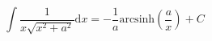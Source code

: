 $$
  \int \frac{1}{x \sqrt{x^2 + a^2}} \mathrm{d}x
  = - \frac{1}{a} \mathrm{arcsinh} \left ( \frac{a}{x} \right )
  + C
$$